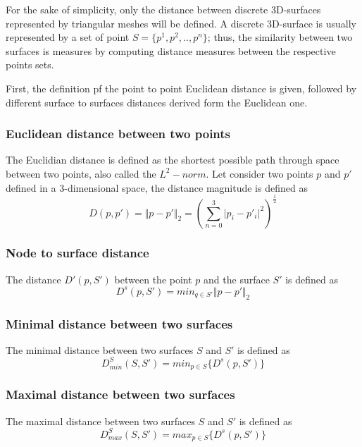 For the sake of simplicity, only the distance between discrete 3D-surfaces represented by triangular meshes will be defined. A discrete 3D-surface is usually represented by a set of point $S = \lbrace p^1, p^2, ..,p^n \rbrace$; thus, the similarity between two surfaces is measures by computing distance measures between the respective points sets.  

 First, the definition pf the point to point Euclidean distance is given, followed by different surface to surfaces distances derived form the Euclidean one.

\subsubsection*{Euclidean distance between two points}
The Euclidian distance is defined as the shortest possible path through space between two points, also called the $L^2-norm$.  Let consider two points $p$ and $p'$ defined in a 3-dimensional space, the distance magnitude is defined as 
\begin{equation}
D(p,p') =\Vert p-p' \Vert_2  =(\sum_{n=0}^{3} \vert p_i - p'_i \vert^2)^{\frac{1}{2}}
\end{equation}
\subsubsection*{Node to surface distance}
The distance $D'(p, S')$ between the point $p$ and the surface $S'$ is defined as
\begin{equation}
D^s(p,S') = min_{q \in S'} \Vert p-p'\Vert_2
\end{equation}
\subsubsection*{Minimal distance between two surfaces}
The minimal distance between two surfaces $S$ and $S'$ is defined as 
\begin{equation}
D^S_{min}(S, S') =  min_{p \in S} \lbrace D^s(p, S') \rbrace
\end{equation}
\subsubsection*{Maximal distance between two surfaces}
The maximal distance between two surfaces $S$ and $S'$ is defined as 
\begin{equation}
D^S_{max}(S, S') =  max_{p \in S} \lbrace D^s(p, S')\rbrace
\end{equation}

